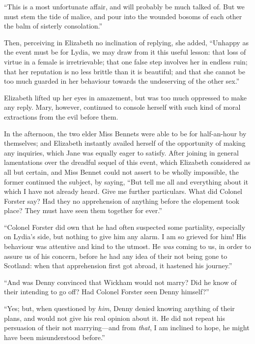 \documentclass[12pt,english,oneside]{book}
\begin{document}
{}``This is a most unfortunate affair, and will probably be much
talked of. But we must stem the tide of malice, and pour into the
wounded bosoms of each other the balm of sisterly consolation.''

Then, perceiving in Elizabeth no inclination of replying, she added,
{}``Unhappy as the event must be for Lydia, we may draw from it this
useful lesson: that loss of virtue in a female is irretrievable; that
one false step involves her in endless ruin; that her reputation is
no less brittle than it is beautiful; and that she cannot be too much
guarded in her behaviour towards the undeserving of the other sex.''

Elizabeth lifted up her eyes in amazement, but was too much oppressed
to make any reply. Mary, however, continued to console herself with
such kind of moral extractions from the evil before them.

In the afternoon, the two elder Miss Bennets were able to be for half-an-hour
by themselves; and Elizabeth instantly availed herself of the opportunity
of making any inquiries, which Jane was equally eager to satisfy.
After joining in general lamentations over the dreadful sequel of
this event, which Elizabeth considered as all but certain, and Miss
Bennet could not assert to be wholly impossible, the former continued
the subject, by saying, {}``But tell me all and everything about
it which I have not already heard. Give me further particulars. What
did Colonel Forster say? Had they no apprehension of anything before
the elopement took place? They must have seen them together for ever.''

{}``Colonel Forster did own that he had often suspected some partiality,
especially on Lydia's side, but nothing to give him any alarm. I am
so grieved for him! His behaviour was attentive and kind to the utmost.
He \textit{was} coming to us, in order to assure us of his concern,
before he had any idea of their not being gone to Scotland: when that
apprehension first got abroad, it hastened his journey.''

{}``And was Denny convinced that Wickham would not marry? Did he
know of their intending to go off? Had Colonel Forster seen Denny
himself?''\ 

{}``Yes; but, when questioned by \textit{him}, Denny denied knowing
anything of their plans, and would not give his real opinion about
it. He did not repeat his persuasion of their not marrying\mbox{---}and
from \textit{that}, I am inclined to hope, he might have been misunderstood
before.''
\end{document}
